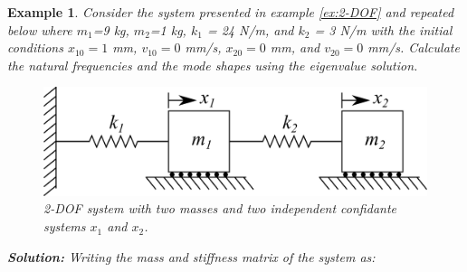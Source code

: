 \documentclass[12pt,letter]{article}
\newtheorem{ex}{Example}
\numberwithin{ex}{section} %
\newenvironment{example}{\begin{mdframed}[middlelinewidth=0.5mm]\begin{ex}\normalfont}{\end{ex}\end{mdframed}}
\numberwithin{re}{section} %
\begin{document}
\begin{example}
Consider the system presented in example \ref{ex:2-DOF} and repeated below where $m_1$=9 kg, $m_2$=1 kg, $k_1$ = 24 N/m, and $k_2$ = 3 N/m with the initial conditions $x_{10}=1$ mm, $v_{10}=0$ mm/s, $x_{20}=0$ mm, and $v_{20}=0$ mm/s. Calculate the natural frequencies and the mode shapes using the eigenvalue solution. 
\begin{figure}[H]
	\centering
	\includegraphics[]{../Figures/2-DOF-spring_mass_horizontal.png}
	\caption{2-DOF system with two masses and two independent confidante systems $x_1$ and $x_2$.}
\end{figure}




\textbf{Solution:} Writing the mass and stiffness matrix of the system as:


\end{example}
\end{document}
